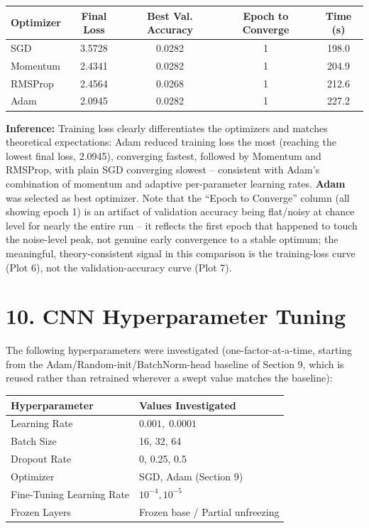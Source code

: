 \documentclass[10pt]{article}
\begin{document}
\begin{center}
\begin{tabular}{|l|c|c|c|c|}
\hline
Optimizer & Final Loss & Best Val. Accuracy & Epoch to Converge & Time (s)\\
\hline
SGD      & 3.5728 & 0.0282 & 1 & 198.0\\
Momentum & 2.4341 & 0.0282 & 1 & 204.9\\
RMSProp  & 2.4564 & 0.0268 & 1 & 212.6\\
Adam     & 2.0945 & 0.0282 & 1 & 227.2\\
\hline
\end{tabular}
\end{center}

\textbf{Inference:} Training loss clearly differentiates the optimizers
and matches theoretical expectations: Adam reduced training loss the
most (reaching the lowest final loss, 2.0945), converging fastest,
followed by Momentum and RMSProp, with plain SGD converging slowest --
consistent with Adam's combination of momentum and adaptive per-parameter
learning rates. \textbf{Adam} was selected as best optimizer. Note that
the ``Epoch to Converge'' column (all showing epoch 1) is an artifact of
validation accuracy being flat/noisy at chance level for nearly the
entire run -- it reflects the first epoch that happened to touch the
noise-level peak, not genuine early convergence to a stable optimum; the
meaningful, theory-consistent signal in this comparison is the
training-loss curve (Plot 6), not the validation-accuracy curve (Plot 7).

\section*{10. CNN Hyperparameter Tuning}

The following hyperparameters were investigated (one-factor-at-a-time,
starting from the Adam/Random-init/BatchNorm-head baseline of Section 9,
which is reused rather than retrained wherever a swept value matches the
baseline):

\begin{center}
\begin{tabular}{|l|l|}
\hline
Hyperparameter & Values Investigated\\
\hline
Learning Rate & $0.001,\;0.0001$\\
Batch Size & 16, 32, 64\\
Dropout Rate & 0, 0.25, 0.5\\
Optimizer & SGD, Adam (Section 9)\\
Fine-Tuning Learning Rate & $10^{-4},10^{-5}$\\
Frozen Layers & Frozen base / Partial unfreezing\\
\hline
\end{tabular}
\end{center}
\end{document}

